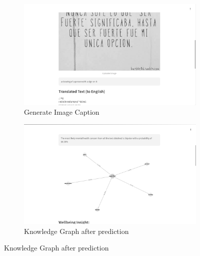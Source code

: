 \begin{figure}[h!]
    \centering
    \begin{subfigure}[b]{0.495\textwidth}
        \centering
        \includegraphics[width=\textwidth]{App Images/18 Interface.png}
        \caption*{Generate Image Caption}
        \label{fig:10i234}
    \end{subfigure}
    \hfill
    \begin{subfigure}[b]{0.495\textwidth}
        \centering
        \includegraphics[width=\textwidth]{App Images/19 Interface.png}
        \caption*{Knowledge Graph after prediction}
        \label{fig:10i23445}
    \end{subfigure}
    \label{fig:generated_caption_vs_kg}
\end{figure}

\vspace{-2em}

